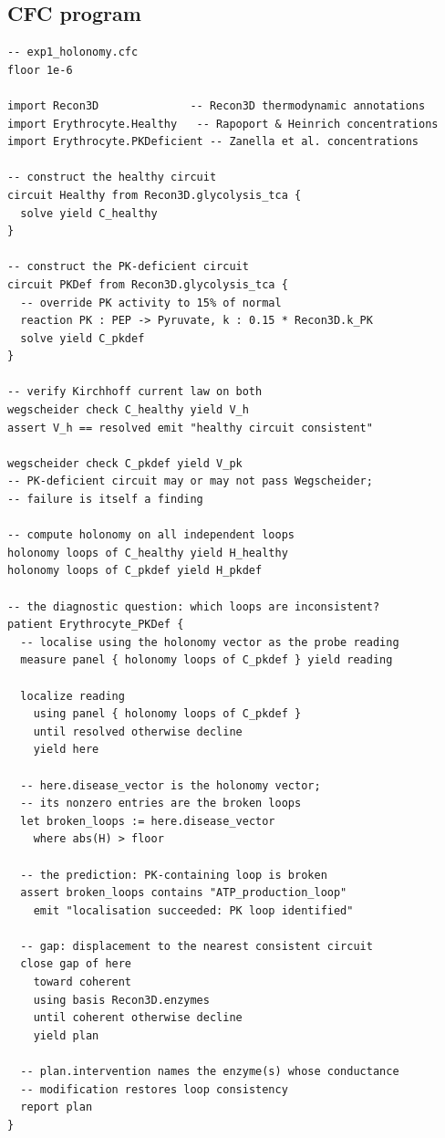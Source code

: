 \documentclass[11pt,a4paper]{article}
\theoremstyle{expthm}
\theoremstyle{definition}
\theoremstyle{remark}
\begin{document}
\subsection{CFC program}

\begin{lstlisting}[caption={E1: holonomy diagnosis on Recon3D.}]
-- exp1_holonomy.cfc
floor 1e-6

import Recon3D              -- Recon3D thermodynamic annotations
import Erythrocyte.Healthy   -- Rapoport & Heinrich concentrations
import Erythrocyte.PKDeficient -- Zanella et al. concentrations

-- construct the healthy circuit
circuit Healthy from Recon3D.glycolysis_tca {
  solve yield C_healthy
}

-- construct the PK-deficient circuit
circuit PKDef from Recon3D.glycolysis_tca {
  -- override PK activity to 15% of normal
  reaction PK : PEP -> Pyruvate, k : 0.15 * Recon3D.k_PK
  solve yield C_pkdef
}

-- verify Kirchhoff current law on both
wegscheider check C_healthy yield V_h
assert V_h == resolved emit "healthy circuit consistent"

wegscheider check C_pkdef yield V_pk
-- PK-deficient circuit may or may not pass Wegscheider;
-- failure is itself a finding

-- compute holonomy on all independent loops
holonomy loops of C_healthy yield H_healthy
holonomy loops of C_pkdef yield H_pkdef

-- the diagnostic question: which loops are inconsistent?
patient Erythrocyte_PKDef {
  -- localise using the holonomy vector as the probe reading
  measure panel { holonomy loops of C_pkdef } yield reading

  localize reading
    using panel { holonomy loops of C_pkdef }
    until resolved otherwise decline
    yield here

  -- here.disease_vector is the holonomy vector;
  -- its nonzero entries are the broken loops
  let broken_loops := here.disease_vector
    where abs(H) > floor

  -- the prediction: PK-containing loop is broken
  assert broken_loops contains "ATP_production_loop"
    emit "localisation succeeded: PK loop identified"

  -- gap: displacement to the nearest consistent circuit
  close gap of here
    toward coherent
    using basis Recon3D.enzymes
    until coherent otherwise decline
    yield plan

  -- plan.intervention names the enzyme(s) whose conductance
  -- modification restores loop consistency
  report plan
}
\end{lstlisting}
\end{document}
